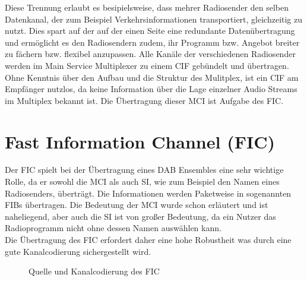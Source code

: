 Diese Trennung erlaubt es besipielsweise, dass mehrer Radiosender den selben Datenkanal, der zum Beispiel Verkehrsinformationen transportiert, gleichzeitig zu nutzt. Dies spart auf der auf der einen Seite eine redundante Datenübertragung und ermöglicht es den Radiosendern zudem, ihr Programm bzw. Angebot breiter zu fächern bzw. flexibel anzupassen. Alle Kanäle der verschiedenen Radiosender werden im Main Service Multiplexer zu einem \ac{CIF} gebündelt und übertragen. Ohne Kenntnis über den Aufbau und die Struktur des Mulitplex, ist ein \ac{CIF} am Empfänger nutzlos, da keine Information über die Lage einzelner Audio Streams im Multiplex bekannt ist. Die Übertragung dieser \ac{MCI} ist Aufgabe des \ac{FIC}.

\section{Fast Information Channel (FIC)}
\label{sec:FIC}
Der \ac{FIC} spielt bei der Übertragung eines DAB Ensembles eine sehr wichtige Rolle, da er sowohl die \ac{MCI} als auch \ac{SI}, wie zum Beispiel den Namen eines Radiosenders, überträgt. Die Informationen werden Paketweise in sogenannten \acp{FIB} übertragen. Die Bedeutung der \ac{MCI} wurde schon erläutert und ist naheliegend, aber auch die \ac{SI} ist von großer Bedeutung, da ein Nutzer das Radioprogramm nicht ohne dessen Namen auswählen kann. \\
Die Übertragung des FIC erfordert daher eine hohe Robustheit was durch eine gute Kanalcodierung sichergestellt wird.
\begin{figure} [h]
\begin{center}
\end{center}
\label{chart:fic_encoder}
\caption{Quelle und Kanalcodierung des FIC}
\end{figure}

